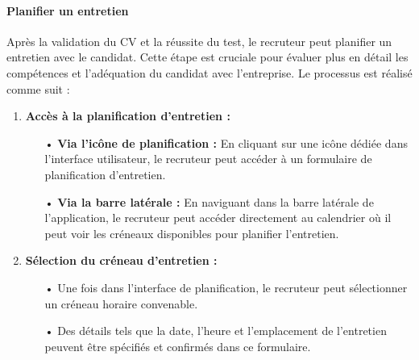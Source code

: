 \paragraph*{Planifier un entretien}

Après la validation du CV et la réussite du test, le recruteur peut 
planifier un entretien avec le candidat. Cette étape est cruciale pour 
évaluer plus en détail les compétences et l'adéquation du 
candidat avec l'entreprise. 
Le processus est 
réalisé comme suit :

\begin{enumerate}
    \item \textbf{Accès à la planification d'entretien :}
        \begin{itemize}
            \item[•] \textbf{Via l'icône de planification :} En cliquant sur une icône dédiée dans l'interface utilisateur, le recruteur peut accéder à un formulaire de planification d'entretien.
            \item[•] \textbf{Via la barre latérale :} En naviguant dans la barre latérale de l'application, le recruteur peut accéder directement au calendrier où il peut voir les créneaux disponibles pour planifier l'entretien.
        \end{itemize}
    
    \item \textbf{Sélection du créneau d'entretien :}
        \begin{itemize}
            \item[•] Une fois dans l'interface de planification, le recruteur peut sélectionner un créneau horaire convenable.
            \item[•] Des détails tels que la date, l'heure et l'emplacement de l'entretien peuvent être spécifiés et confirmés dans ce formulaire.
        \end{itemize}
    
\end{enumerate}


